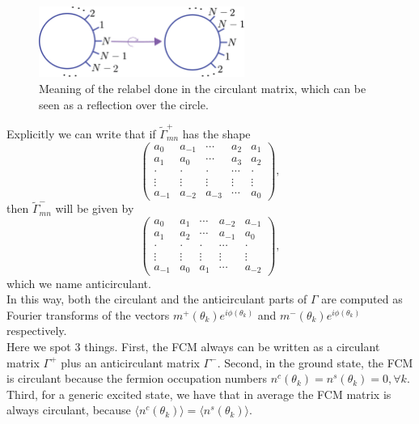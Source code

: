 \begin{figure}[H]
    \centering
    \includegraphics[width=0.6\textwidth]{Figures/Reflection_over_circle.png}
    \caption{Meaning of the relabel done in the circulant matrix, which can be seen as a reflection over the circle.}
    \label{reflectioncircle}
\end{figure}
Explicitly we can write that if $\tilde{\Gamma}^{+}_{mn}$ has the shape
\begin{equation}
\left(\begin{array}{ccccc}
a_{0} & a_{-1} & \cdots & a_{2} & a_{1} \\
a_{1} & a_{0} & \cdots & a_{3} & a_{2} \\
\cdot & \cdot & \cdot & \cdots & \cdot \\
\vdots & \vdots & \vdots & \vdots & \vdots \\
a_{-1} & a_{-2} & a_{-3} & \cdots & a_{0}
\end{array}\right),
\end{equation}
then $\tilde{\Gamma}^{-}_{mn}$ will be given by
\begin{equation}
\left(\begin{array}{ccccc}
a_{0} & a_{1} & \cdots & a_{-2} & a_{-1} \\
a_{1} & a_{2} & \cdots & a_{-1} & a_{0} \\
\cdot & \cdot & \cdot & \cdots & \cdot \\
\vdots & \vdots & \vdots & \vdots & \vdots \\
a_{-1} & a_{0} & a_{1} & \cdots & a_{-2}
\end{array}\right),
\end{equation}
which we name anticirculant.\\
\indent In this way, both the circulant and the anticirculant parts of $\Gamma$ are computed as Fourier transforms of the vectors $m^{+}(\theta_k)e^{i\phi(\theta_k)}$ and $m^{-}(\theta_k)e^{i\phi(\theta_k)}$ respectively.\\
\indent Here we spot 3 things. First, the FCM always can be written as a circulant matrix $\Gamma^{+}$ plus an anticirculant matrix $\Gamma^{-}$. Second, in the ground state, the FCM is circulant because the fermion occupation numbers $n^{c}\left(\theta_{k}\right)=n^{s}\left(\theta_{k}\right)=0, \forall k$. Third, for a generic excited state, we have that in average the FCM matrix is always circulant, because $\langle n^{c}\left(\theta_{k}\right)\rangle=\langle n^{s}\left(\theta_{k}\right)\rangle$.
